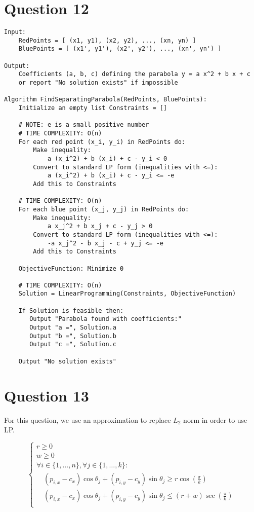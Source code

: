 \documentclass{article}
\begin{document}
\section*{Question 12}
\begin{verbatim}
Input: 
    RedPoints = [ (x1, y1), (x2, y2), ..., (xn, yn) ]
    BluePoints = [ (x1', y1'), (x2', y2'), ..., (xn', yn') ]

Output:
    Coefficients (a, b, c) defining the parabola y = a x^2 + b x + c
    or report "No solution exists" if impossible

Algorithm FindSeparatingParabola(RedPoints, BluePoints): 
    Initialize an empty list Constraints = []

    # NOTE: e is a small positive number
    # TIME COMPLEXITY: O(n)
    For each red point (x_i, y_i) in RedPoints do:
        Make inequality:
            a (x_i^2) + b (x_i) + c - y_i < 0
        Convert to standard LP form (inequalities with <=):
            a (x_i^2) + b (x_i) + c - y_i <= -e
        Add this to Constraints

    # TIME COMPLEXITY: O(n)
    For each blue point (x_j, y_j) in RedPoints do:
        Make inequality:
            a x_j^2 + b x_j + c - y_j > 0
        Convert to standard LP form (inequalities with <=):
            -a x_j^2 - b x_j - c + y_j <= -e
        Add this to Constraints

    ObjectiveFunction: Minimize 0

    # TIME COMPLEXITY: O(n)
    Solution = LinearProgramming(Constraints, ObjectiveFunction)

    If Solution is feasible then:
       Output "Parabola found with coefficients:"
       Output "a =", Solution.a
       Output "b =", Solution.b
       Output "c =", Solution.c

    Output "No solution exists"
\end{verbatim}

\newpage

\section*{Question 13}
For this question, we use an approximation to replace $L_2$ norm in order to use LP.

\[
    \begin{cases}
        r \geq 0 \\
        w \geq 0 \\
        \forall i \in \{1, \ldots, n\}, \forall j \in \{1, \ldots, k\}: \\
        \quad (p_{i,x} - c_x) \cos \theta_j + (p_{i,y} - c_y) \sin \theta_j \geq r \cos\left(\frac{\pi}{k}\right) \\
        \quad (p_{i,x} - c_x) \cos \theta_j + (p_{i,y} - c_y) \sin \theta_j \leq (r + w) \sec\left(\frac{\pi}{k}\right) \\
    \end{cases}
\]
\end{document}
